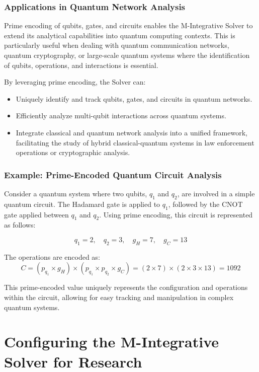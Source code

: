 \documentclass[%
 preprint, linenumbers,
 amsmath,amssymb,
 aps, physrev,
]{revtex4-2}
\begin{document}
\subsubsection{Applications in Quantum Network Analysis}

Prime encoding of qubits, gates, and circuits enables the M-Integrative Solver to extend its analytical capabilities into quantum computing contexts. This is particularly useful when dealing with quantum communication networks, quantum cryptography, or large-scale quantum systems where the identification of qubits, operations, and interactions is essential.

By leveraging prime encoding, the Solver can:
\begin{itemize}
    \item Uniquely identify and track qubits, gates, and circuits in quantum networks.
    \item Efficiently analyze multi-qubit interactions across quantum systems.
    \item Integrate classical and quantum network analysis into a unified framework, facilitating the study of hybrid classical-quantum systems in law enforcement operations or cryptographic analysis.
\end{itemize}

\subsubsection{Example: Prime-Encoded Quantum Circuit Analysis}

Consider a quantum system where two qubits, \( q_1 \) and \( q_2 \), are involved in a simple quantum circuit. The Hadamard gate is applied to \( q_1 \), followed by the CNOT gate applied between \( q_1 \) and \( q_2 \). Using prime encoding, this circuit is represented as follows:

\[
q_1 = 2, \quad q_2 = 3, \quad g_H = 7, \quad g_C = 13
\]

The operations are encoded as:
\[
C = (p_{q_1} \times g_H) \times (p_{q_1} \times p_{q_2} \times g_C) = (2 \times 7) \times (2 \times 3 \times 13) = 1092
\]

This prime-encoded value uniquely represents the configuration and operations within the circuit, allowing for easy tracking and manipulation in complex quantum systems.

\section{Configuring the M-Integrative Solver for Research}
\end{document}
